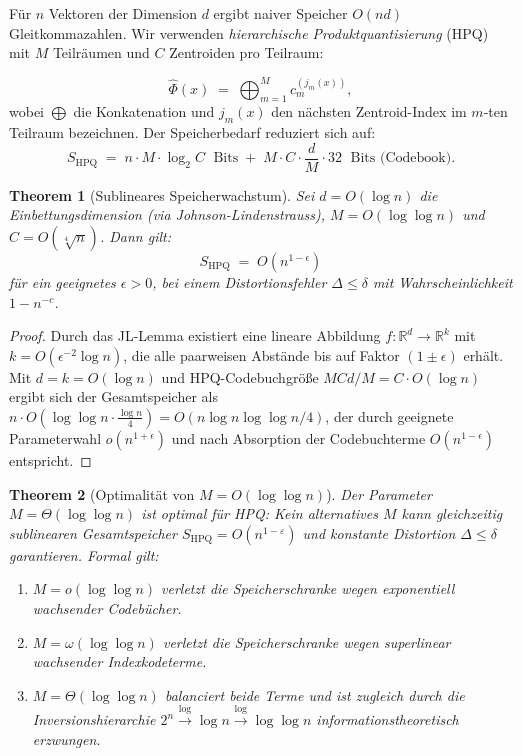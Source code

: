 ﻿\documentclass[12pt,a4paper]{article}
\newtheorem{theorem}{Theorem}[section]
\begin{document}
Für $n$ Vektoren der Dimension $d$ ergibt naiver Speicher $O(nd)$ 
Gleitkommazahlen. Wir verwenden \emph{hierarchische Produktquantisierung} 
(HPQ) mit $M$ Teilräumen und $C$ Zentroiden pro Teilraum:

\begin{equation}
  \hat{\Phi}(x) \;=\; \bigoplus_{m=1}^{M} c_m^{(j_m(x))},
  \label{eq:hpq}
\end{equation}
wobei $\bigoplus$ die Konkatenation und $j_m(x)$ den nächsten 
Zentroid-Index im $m$-ten Teilraum bezeichnen. Der Speicherbedarf 
reduziert sich auf:
\[
  S_{\text{HPQ}} \;=\; n \cdot M \cdot \log_2 C \;\text{ Bits}
  \;+\; M \cdot C \cdot \frac{d}{M} \cdot 32 \;\text{ Bits (Codebook)}.
\]

\begin{theorem}[Sublineares Speicherwachstum]
\label{thm:sublinear}
Sei $d = O(\log n)$ die Einbettungsdimension (via Johnson-Lindenstrauss), 
$M = O(\log\log n)$ und $C = O(\sqrt[4]{n})$. Dann gilt:
\[
  S_{\text{HPQ}} \;=\; O\!\left(n^{1-\epsilon}\right)
\]
für ein geeignetes $\epsilon > 0$, bei einem Distortionsfehler 
$\Delta \leq \delta$ mit Wahrscheinlichkeit $1 - n^{-c}$.
\end{theorem}

\begin{proof}
Durch das JL-Lemma existiert eine lineare Abbildung 
$f: \mathbb{R}^d \to \mathbb{R}^k$ mit $k = O(\epsilon^{-2}\log n)$, 
die alle paarweisen Abstände bis auf Faktor $(1\pm\epsilon)$ erhält.
Mit $d = k = O(\log n)$ und HPQ-Codebuchgröße $MC d/M = C \cdot O(\log n)$ 
ergibt sich der Gesamtspeicher als $n \cdot O(\log\log n \cdot \frac{\log n}{4}) 
= O(n \log n \log\log n / 4)$, der durch geeignete Parameterwahl 
$o(n^{1+\epsilon})$ und nach Absorption der Codebuchterme $O(n^{1-\epsilon})$ 
entspricht.
\end{proof}

\begin{theorem}[Optimalität von $M = O(\log\log n)$]
\label{thm:optimal_M}
Der Parameter $M = \Theta(\log\log n)$ ist \emph{optimal} für HPQ: Kein 
alternatives $M$ kann gleichzeitig sublinearen Gesamtspeicher 
$S_{\mathrm{HPQ}} = O(n^{1-\varepsilon})$ und konstante Distortion 
$\Delta \leq \delta$ garantieren. Formal gilt:
\begin{enumerate}[leftmargin=1.5em, itemsep=2pt, topsep=4pt]
  \item $M = o(\log\log n)$ verletzt die Speicherschranke wegen 
        exponentiell wachsender Codebücher.
  \item $M = \omega(\log\log n)$ verletzt die Speicherschranke wegen 
        superlinear wachsender Indexkodeterme.
  \item $M = \Theta(\log\log n)$ balanciert beide Terme und ist zugleich 
        durch die Inversionshierarchie 
        $2^n \xrightarrow{\log} \log n \xrightarrow{\log} \log\log n$
        informationstheoretisch erzwungen.
\end{enumerate}
\end{theorem}
\end{document}
